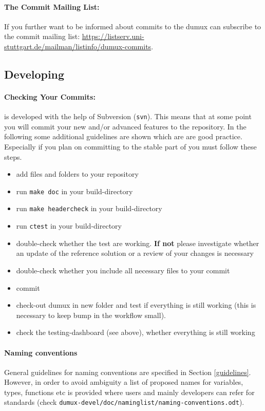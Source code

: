 \paragraph{The Commit Mailing List:}
If you further want to be informed about commits to the dumux can subscribe
to the commit mailing list:
\url{https://listserv.uni-stuttgart.de/mailman/listinfo/dumux-commits}.

\subsection{Developing \Dumux}
\paragraph{Checking Your Commits:}
\Dumux is developed with the help of Subversion (\texttt{svn}).
This means that at some point you will commit your new and/or advanced features
to the repository. In the following some additional guidelines are shown which are
are good practice. Especially if you plan on committing to the stable part of
\Dumux you must follow these steps.
\begin{itemize}
  \item add files and folders to your repository
  \item run \texttt{make doc} in your build-directory
  \item run \texttt{make headercheck} in your build-directory
  \item run \texttt{ctest} in your build-directory
  \item double-check whether the test are working. \textbf{If not} please
        investigate whether an update of the reference solution or a review
        of your changes is necessary
  \item double-check whether you include all necessary files to your commit
  \item commit
  \item check-out dumux in new folder and test if everything is still working
        (this is necessary to keep bump in the workflow small).
  \item check the testing-dashboard (see above), whether everything is still working
\end{itemize}

\paragraph{Naming conventions}
General guidelines for naming conventions are specified in Section \ref{guidelines}.
However, in order to avoid ambiguity a list of proposed names for variables, types,
functions etc is provided where users and mainly \Dumux developers can refer for
standards (check \texttt{dumux-devel/\allowbreak doc/\allowbreak naminglist/\allowbreak naming-conventions.odt}).

